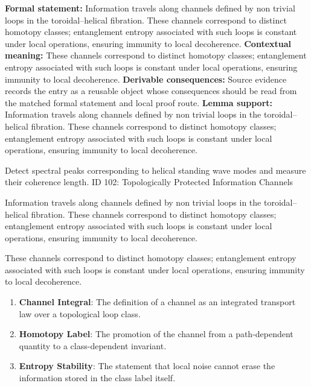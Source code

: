 \begingroup\footnotesize\setlength{\emergencystretch}{3em}\sloppy
\textbf{Formal statement:} Information travels along channels defined by non trivial loops in the toroidal--helical fibration. These channels correspond to distinct homotopy classes; entanglement entropy associated with such loops is constant under local operations, ensuring immunity to local decoherence.
\textbf{Contextual meaning:} These channels correspond to distinct homotopy classes; entanglement entropy associated with such loops is constant under local operations, ensuring immunity to local decoherence.
\textbf{Derivable consequences:} Source evidence records the entry as a reusable object whose consequences should be read from the matched formal statement and local proof route.
\textbf{Lemma support:} Information travels along channels defined by non trivial loops in the toroidal--helical fibration. These channels correspond to distinct homotopy classes; entanglement entropy associated with such loops is constant under local operations, ensuring immunity to local decoherence.\par
\endgroup

Detect spectral peaks corresponding to helical standing wave modes and measure their coherence length. ID 102: Topologically Protected Information Channels

Information travels along channels defined by non trivial loops in the toroidal--helical fibration. These channels correspond to distinct homotopy classes; entanglement entropy associated with such loops is constant under local operations, ensuring immunity to local decoherence.

These channels correspond to distinct homotopy classes; entanglement entropy associated with such loops is constant under local operations, ensuring immunity to local decoherence.
\endgroup

\begin{enumerate}[leftmargin=1.6em,itemsep=6pt,topsep=4pt]
\item \textbf{Channel Integral}: The definition of a channel as an integrated transport law over a topological loop class.
\item \textbf{Homotopy Label}: The promotion of the channel from a path-dependent quantity to a class-dependent invariant.
\item \textbf{Entropy Stability}: The statement that local noise cannot erase the information stored in the class label itself.
\end{enumerate}

